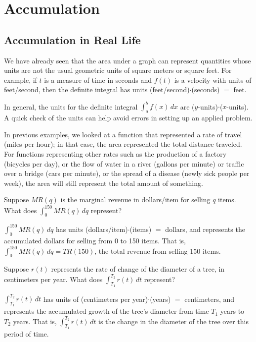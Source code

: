 \section{Accumulation}
\label{sec:accumulation}

\subsection{Accumulation in Real Life}
We have already seen that the area under a graph can represent quantities whose units are not the usual geometric units of square meters or square feet. For example, if $t$ is a measure of time in seconds and $f(t)$ is a velocity with units of feet/second, then the definite integral has units (feet/second)$\cdot$(seconds) $=$ feet.

In general, the units for the definite integral $\int_a^bf(x)\,dx$ are ($y$-units)$\cdot$($x$-units). A quick check of the units can help avoid errors in setting up an applied problem.

In previous examples, we looked at a function that represented a rate of travel (miles per hour); in that case, the area represented the total distance traveled. For functions representing other rates such as the production of a factory (bicycles per day), or the flow of water in a river (gallons per minute) or traffic over a bridge (cars per minute), or the spread of a disease (newly sick people per week), the area will still represent the total amount of something.

\begin{example}
Suppose $MR(q)$ is the marginal revenue in dollars/item for selling $q$ items. What does $\int_0^{150}MR(q)\,dq$ represent?

\begin{solution}
  $\int_0^{150}MR(q)\,dq$ has units (dollars/item)$\cdot$(items) $=$ dollars, and represents the accumulated dollars for selling from 0 to 150 items. That is, $\int_0^{150}MR(q)\,dq=TR(150)$, the total revenue from selling 150 items.
\end{solution}\end{example}

\begin{example}
Suppose $r(t)$ represents the rate of change of the diameter of a tree, in centimeters per year. What does $\int_{T_1}^{T_2}r(t)\,dt$ represent?

\begin{solution}
  $\int_{T_1}^{T_2}r(t)\,dt$ has units of (centimeters per year)$\cdot$(years) $=$ centimeters, and represents the accumulated growth of the tree's diameter from time $T_1$ years to $T_2$ years. That is, $\int_{T_1}^{T_2}r(t)\,dt$ is the change in the diameter of the tree over this period of time.
\end{solution}\end{example}
